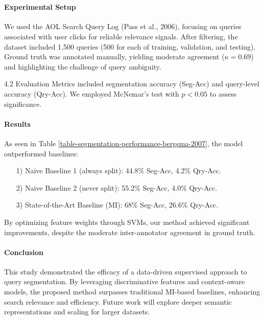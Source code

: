 \\

\paragraph*{Experimental Setup}
We used the AOL Search Query Log (Pass et al., 2006), focusing on queries associated with user clicks for reliable relevance signals. After filtering, the dataset included 1,500 queries (500 for each of training, validation, and testing). Ground truth was annotated manually, yielding moderate agreement ($\kappa=0.69$) and highlighting the challenge of query ambiguity.

4.2 Evaluation
Metrics included segmentation accuracy (Seg-Acc) and query-level accuracy (Qry-Acc). We employed McNemar's test with $p<0.05$ to assess significance.

\paragraph*{Results}
As seen in Table \ref{table-segmentation-performance-bergsma-2007}, the model outperformed baselines:
\begin{enumerate}
\item[1)] Naive Baseline 1 (always split): 44.8\% Seg-Acc, 4.2\% Qry-Acc.
\item[2)] Naive Baseline 2 (never split): 55.2\% Seg-Acc, 4.0\% Qry-Acc.
\item[3)] State-of-the-Art Baseline (MI): 68\% Seg-Acc, 26.6\% Qry-Acc.
\end{enumerate}
By optimizing feature weights through SVMs, our method achieved significant improvements, despite the moderate inter-annotator agreement in ground truth.

\paragraph*{Conclusion}
This study demonstrated the efficacy of a data-driven supervised approach to query segmentation. By leveraging discriminative features and context-aware models, the proposed method surpasses traditional MI-based baselines, enhancing search relevance and efficiency. Future work will explore deeper semantic representations and scaling for larger datasets.
